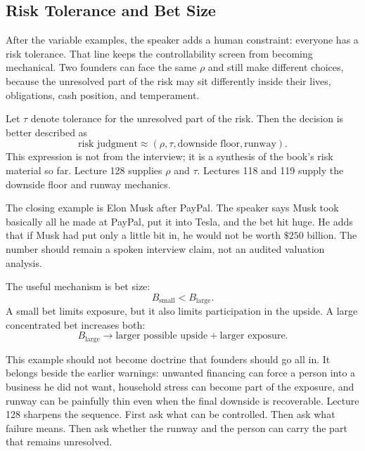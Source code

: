 \documentclass[11pt,oneside]{book}
\begin{document}
\subsection{Risk Tolerance and Bet Size}

After the variable examples, the speaker adds a human constraint: everyone has a risk tolerance. That line keeps the controllability screen from becoming mechanical. Two founders can face the same \(\rho\) and still make different choices, because the unresolved part of the risk may sit differently inside their lives, obligations, cash position, and temperament.

Let \(\tau\) denote tolerance for the unresolved part of the risk. Then the decision is better described as
\begin{equation}
\text{risk judgment}
\approx
(\rho,\tau,\text{downside floor},\text{runway}).
\end{equation}
This expression is not from the interview; it is a synthesis of the book's risk material so far. Lecture 128 supplies \(\rho\) and \(\tau\). Lectures 118 and 119 supply the downside floor and runway mechanics.

The closing example is Elon Musk after PayPal. The speaker says Musk took basically all he made at PayPal, put it into Tesla, and the bet hit huge. He adds that if Musk had put only a little bit in, he would not be worth \(\$250\) billion. The number should remain a spoken interview claim, not an audited valuation analysis.

The useful mechanism is bet size:
\begin{equation}
B_{\mathrm{small}}<B_{\mathrm{large}}.
\end{equation}
A small bet limits exposure, but it also limits participation in the upside. A large concentrated bet increases both:
\begin{equation}
B_{\mathrm{large}}
\longrightarrow
\text{larger possible upside}
+
\text{larger exposure}.
\end{equation}

This example should not become doctrine that founders should go all in. It belongs beside the earlier warnings: unwanted financing can force a person into a business he did not want, household stress can become part of the exposure, and runway can be painfully thin even when the final downside is recoverable. Lecture 128 sharpens the sequence. First ask what can be controlled. Then ask what failure means. Then ask whether the runway and the person can carry the part that remains unresolved.
\end{document}
